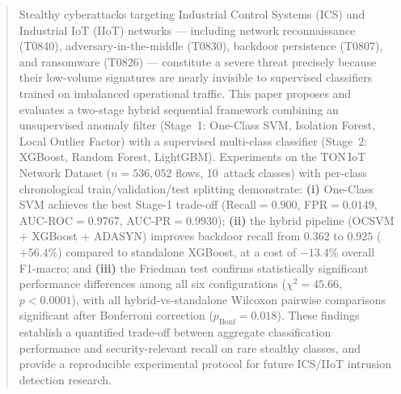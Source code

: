 \begin{abstract}
Stealthy cyberattacks targeting Industrial Control Systems (ICS) and Industrial
IoT (IIoT) networks --- including network reconnaissance (T0840), adversary-in-the-middle
(T0830), backdoor persistence (T0807), and ransomware (T0826) --- constitute a severe
threat precisely because their low-volume signatures are nearly invisible to supervised
classifiers trained on imbalanced operational traffic.
This paper proposes and evaluates a two-stage hybrid sequential framework combining an
unsupervised anomaly filter (Stage~1: One-Class SVM, Isolation Forest, Local Outlier Factor)
with a supervised multi-class classifier (Stage~2: XGBoost, Random Forest, LightGBM).
Experiments on the TON\,IoT Network Dataset ($n=536{,}052$ flows, 10~attack classes)
with per-class chronological train/validation/test splitting demonstrate:
\textbf{(i)} One-Class SVM achieves the best Stage-1 trade-off
(Recall$=0.900$, FPR$=0.0149$, AUC-ROC$=0.9767$, AUC-PR$=0.9930$);
\textbf{(ii)} the hybrid pipeline (OCSVM + XGBoost + ADASYN) improves backdoor recall
from $0.362$ to $0.925$ ($+56.4\%$) compared to standalone XGBoost, at a cost of
$-13.4\%$ overall F1-macro; and
\textbf{(iii)} the Friedman test confirms statistically significant performance differences
among all six configurations ($\chi^2=45.66$, $p<0.0001$), with all hybrid-vs-standalone
Wilcoxon pairwise comparisons significant after Bonferroni correction
($p_\text{Bonf}=0.018$).
These findings establish a quantified trade-off between aggregate classification
performance and security-relevant recall on rare stealthy classes, and provide a
reproducible experimental protocol for future ICS/IIoT intrusion detection research.
\end{abstract}
